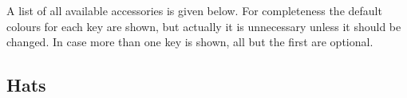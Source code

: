 \documentclass[parskip=half]{scrartcl}
\begin{document}
\begin{tcblisting}{}
\owl
\thing[tophat,scale=1.5,yshift=-0.6cm,xshift=-0.05cm]
\end{tcblisting}

A list of all available accessories is given below. For completeness the default colours for each key are shown, but actually it is unnecessary unless it should be changed. In case more than one key is shown, all but the first are optional.

\subsection{Hats}

\begin{tcblisting}{}
\penguin[
  hat=blue!40!black
]
\end{tcblisting}

\begin{tcblisting}{}
\snowman[
  tophat=black!90!white
]
\end{tcblisting}

\begin{tcblisting}{}
\mouse[
  beret=black
]
\end{tcblisting}

\begin{tcblisting}{}
\anteater[
  strawhat=blue,
  ribbon=black
]
\end{tcblisting}

\begin{tcblisting}{}
\coati[
  harlequin=blue,
  niuqelrah=red
]
\end{tcblisting}

\begin{tcblisting}{}
\cat[
  witch=gray
]
\end{tcblisting}

\begin{tcblisting}{}
\bear[
  magichat=violet,
  magicstars=yellow!80!brown
]
\end{tcblisting}

\begin{tcblisting}{}
\sheep[
  crown=yellow!90!orange
]
\end{tcblisting}

\begin{tcblisting}{}
\koala[
  queencrown=yellow
]
\end{tcblisting}

\begin{tcblisting}{}
\marmot[
  kingcrown=gray
]
\end{tcblisting}
\end{document}
